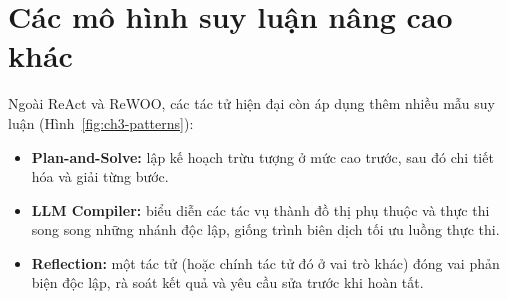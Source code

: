 \section{Các mô hình suy luận nâng cao khác}
Ngoài ReAct và ReWOO, các tác tử hiện đại còn áp dụng thêm nhiều mẫu suy luận (Hình~\ref{fig:ch3-patterns}):
\begin{itemize}
  \item \textbf{Plan-and-Solve:} lập kế hoạch trừu tượng ở mức cao trước, sau đó chi tiết hóa và giải từng bước.
  \item \textbf{LLM Compiler:} biểu diễn các tác vụ thành đồ thị phụ thuộc và thực thi song song những nhánh độc lập,
        giống trình biên dịch tối ưu luồng thực thi.
  \item \textbf{Reflection:} một tác tử (hoặc chính tác tử đó ở vai trò khác) đóng vai phản biện độc lập, rà soát kết
        quả và yêu cầu sửa trước khi hoàn tất.
\end{itemize}

